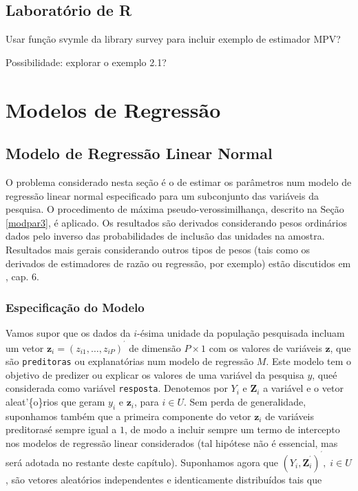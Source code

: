 \documentclass[]{book}
\numberwithin{example}{chapter}
\numberwithin{remark}{chapter}
\numberwithin{definition}{chapter}
\begin{document}
\section{Laboratório de R}\label{laboratorio-de-r-2}

Usar função svymle da library survey para incluir exemplo de estimador
MPV?

Possibilidade: explorar o exemplo 2.1?

\chapter{Modelos de Regressão}\label{modreg}

\section{Modelo de Regressão Linear Normal}\label{modlinear}

O problema considerado nesta seção é o de estimar os parâmetros num
modelo de regressão linear normal especificado para um subconjunto das
variáveis da pesquisa. O procedimento de máxima pseudo-verossimilhança,
descrito na Seção \ref{modpar3}, é aplicado. Os resultados são derivados
considerando pesos ordinários dados pelo inverso das probabilidades de
inclusão das unidades na amostra. Resultados mais gerais considerando
outros tipos de pesos (tais como os derivados de estimadores de razão ou
regressão, por exemplo) estão discutidos em \citep{Silva}, cap. 6.

\subsection{Especificação do Modelo}\label{especificacao-do-modelo}

Vamos supor que os dados da \(i\)-ésima unidade da população pesquisada
incluam um vetor
\(\mathbf{z}_{i}=\left( z_{i1},\ldots ,z_{iP}\right) ^{^{\prime }}\) de
dimensão \(P\times 1\) com os valores de variáveis \(\mathbf{z}\), que
são \texttt{preditoras} ou explanatórias num modelo de regressão \(M\).
Este modelo tem o objetivo de predizer ou explicar os valores de uma
variável da pesquisa \(y\), queé considerada como variável
\texttt{resposta}. Denotemos por \(Y_{i}\) e \(\mathbf{Z}_{i}\) a
variável e o vetor aleat'\{o\}rios que geram \(y_{i}\) e
\(\mathbf{z}_{i}\), para \(i\in U\). Sem perda de generalidade,
suponhamos também que a primeira componente do vetor \(\mathbf{z}_{i}\)
de variáveis preditorasé sempre igual a \(1\), de modo a incluir sempre
um termo de intercepto nos modelos de regressão linear considerados (tal
hipótese não é essencial, mas será adotada no restante deste capítulo).
Suponhamos agora que
\(\left( Y_{i},\mathbf{Z}_{i}^{^{\prime }}\right) ^{^{\prime }},\;i\in U\),
são vetores aleatórios independentes e identicamente distribuídos tais
que
\end{document}
